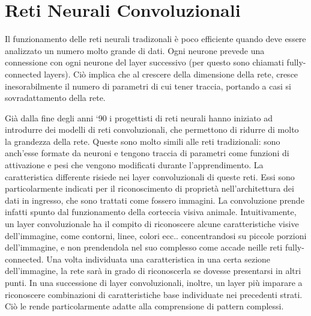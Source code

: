 \documentclass{article}
\begin{document}
\section{Reti Neurali Convoluzionali}
Il funzionamento delle reti neurali tradizonali è poco efficiente quando deve essere analizzato un numero molto grande di dati. Ogni neurone prevede una connessione con ogni neurone del layer successivo (per questo sono chiamati fully-connected layers). Ciò implica che al crescere della dimensione della rete, cresce inesorabilmente il numero di parametri di cui tener traccia, portando a casi si sovradattamento della rete.

Già dalla fine degli anni `90 i progettisti di reti neurali hanno iniziato ad introdurre dei modelli di reti convoluzionali, che permettono di ridurre di molto la grandezza della rete. Queste sono molto simili alle reti tradizionali: sono anch'esse formate da neuroni e tengono traccia di parametri come funzioni di attivazione e pesi che vengono modificati durante l'apprendimento. La caratteristica differente risiede nei layer convoluzionali di queste reti. Essi sono particolarmente indicati per il riconoscimento di proprietà nell'architettura dei dati in ingresso, che sono trattati come fossero immagini. La convoluzione prende infatti spunto dal funzionamento della corteccia visiva animale. Intuitivamente, un layer convoluzionale ha il compito di riconoscere alcune caratteristiche visive dell'immagine, come contorni, linee, colori ecc.. concentrandosi su piccole porzioni dell'immagine, e non prendendola nel suo complesso come accade neille reti fully-connected. Una volta individuata una caratteristica in una certa sezione dell'immagine, la rete sarà in grado di riconoscerla se dovesse presentarsi in altri punti. In una successione di layer convoluzionali, inoltre, un layer più imparare a riconoscere combinazioni di caratteristiche base individuate nei precedenti strati. Ciò le rende particolarmente adatte alla comprensione di pattern complessi.
\end{document}
